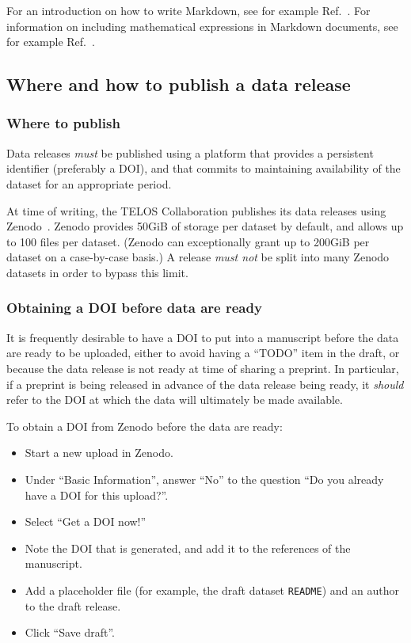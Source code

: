 \documentclass{article}
\newcommand\rfcword[1]{\emph{#1}\xspace}
\newcommand\must{\rfcword{must}}
\newcommand\mustnot{\rfcword{must not}}
\newcommand\should{\rfcword{should}}
\newcommand\filename[1]{\texttt{#1}\xspace}
\newcommand\readme{\filename{README}}
\begin{document}
For an introduction on how to write Markdown,
see for example Ref.~\cite{markdown-guide}.
For information on including mathematical expressions in Markdown documents,
see for example Ref.~\cite{github-markdown}.

\subsection{Where and how to publish a data release}\label{sec:publish-data}

\subsubsection{Where to publish}\label{sec:where}

Data releases \must be published using a platform that provides a persistent identifier
(preferably a DOI),
and that commits to maintaining availability of the dataset for an appropriate period.

At time of writing,
the TELOS Collaboration publishes its data releases using Zenodo~\cite{zenodo}.
Zenodo provides 50GiB of storage per dataset by default,
and allows up to 100 files per dataset.
(Zenodo can exceptionally grant up to 200GiB per dataset on a case-by-case basis.)
A release \mustnot be split into many Zenodo datasets in order to bypass this limit.

\subsubsection{Obtaining a DOI before data are ready}\label{sec:get-doi}

It is frequently desirable to have a DOI to put into a manuscript
before the data are ready to be uploaded,
either to avoid having a ``TODO'' item in the draft,
or because the data release is not ready at time of sharing a preprint.
In particular,
if a preprint is being released in advance of the data release being ready,
it \should refer to the DOI at which the data will ultimately be made available.

To obtain a DOI from Zenodo before the data are ready:

\begin{itemize}
  \item
        Start a new upload in Zenodo.
  \item
        Under ``Basic Information'', answer ``No'' to the question
        ``Do you already have a DOI for this upload?''.
  \item
        Select ``Get a DOI now!''
  \item
        Note the DOI that is generated,
        and add it to the references of the manuscript.
  \item
        Add a placeholder file
        (for example, the draft dataset \readme)
        and an author to the draft release.
  \item
        Click ``Save draft''.
\end{itemize}
\end{document}
